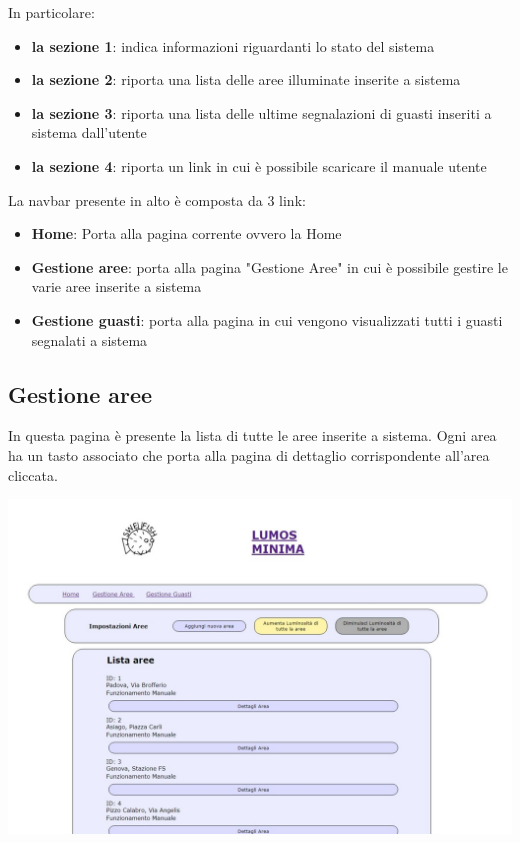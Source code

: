 \documentclass[9pt]{article}
\begin{document}
In particolare:
\begin{itemize}
	\item \textbf{la sezione 1}: indica informazioni riguardanti lo stato del sistema
	\item \textbf{la sezione 2}: riporta una lista delle aree illuminate inserite a sistema
	\item \textbf{la sezione 3}: riporta una lista delle ultime segnalazioni di guasti inseriti a sistema dall'utente
	\item \textbf{la sezione 4}: riporta un link in cui è possibile scaricare il manuale utente\\
\end{itemize}

La navbar presente in alto è composta da 3 link:

\begin{itemize}
	\item \textbf{Home}: Porta alla pagina corrente ovvero la Home
	\item \textbf{Gestione aree}: porta alla pagina "Gestione Aree" in cui è possibile gestire le varie aree inserite a sistema
	\item \textbf{Gestione guasti}: porta alla pagina in cui vengono visualizzati tutti i guasti segnalati a sistema
\end{itemize}

\subsection{Gestione aree}
In questa pagina è presente la lista di tutte le aree inserite a sistema.
Ogni area ha un tasto associato che porta alla pagina di dettaglio corrispondente all'area cliccata.

\begin{center}
	\includegraphics[scale=0.3]{Gestione_aree.png}
\end{center}
\end{document}
